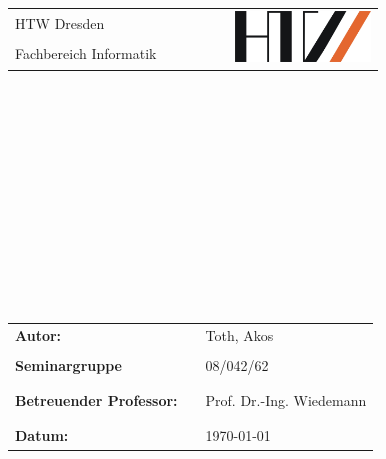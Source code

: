\thispagestyle{empty}
\begin{center}
\begin{tabular}{lcr}
 \Large{HTW Dresden} & \verb|       |& \multirow{3}{*}{\includegraphics[height=1.353cm]{material/htwlogo.jpg}} \\
 \Large{Fachbereich Informatik} &  & \\
\end{tabular}\end{center}
\begin{center}


\end{center}
\begin{verbatim}


\end{verbatim}
\begin{center}
\textbf{\Huge{\ownTitle}}


\end{center}
\begin{verbatim}



\end{verbatim}
\begin{center}
\textbf{\LARGE{\ownTitleZ}}
\end{center}
\begin{verbatim}








\end{verbatim}
\begin{flushleft}
\begin{tabular}{lll}
\textbf{Autor:} & & Toth, Akos\\
& & \\
\textbf{Seminargruppe} & & 08/042/62\\
& & \\
& & \\
\textbf{Betreuender Professor:} & & Prof. Dr.-Ing. Wiedemann\\
& & \\
& & \\
\textbf{Datum:} & & \today\\

\end{tabular}

\end{flushleft}